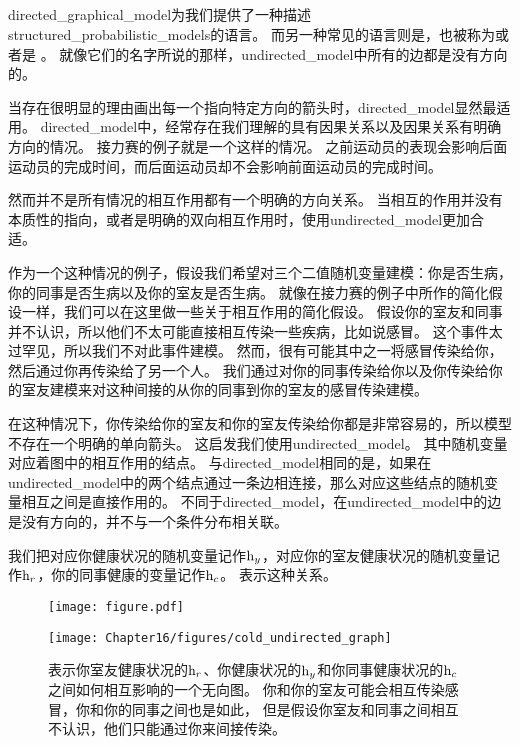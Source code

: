\subsection{}
\label{sec:undirected_models}


\gls{directed_graphical_model}为我们提供了一种描述\gls{structured_probabilistic_models}的语言。
而另一种常见的语言则是，也被称为或者是 \citep{kindermann-book-1980}。
就像它们的名字所说的那样，\gls{undirected_model}中所有的边都是没有方向的。


当存在很明显的理由画出每一个指向特定方向的箭头时，\gls{directed_model}显然最适用。
\gls{directed_model}中，经常存在我们理解的具有因果关系以及因果关系有明确方向的情况。
接力赛的例子就是一个这样的情况。
之前运动员的表现会影响后面运动员的完成时间，而后面运动员却不会影响前面运动员的完成时间。


然而并不是所有情况的相互作用都有一个明确的方向关系。
当相互的作用并没有本质性的指向，或者是明确的双向相互作用时，使用\gls{undirected_model}更加合适。


作为一个这种情况的例子，假设我们希望对三个二值随机变量建模：你是否生病，你的同事是否生病以及你的室友是否生病。
就像在接力赛的例子中所作的简化假设一样，我们可以在这里做一些关于相互作用的简化假设。
假设你的室友和同事并不认识，所以他们不太可能直接相互传染一些疾病，比如说感冒。
这个事件太过罕见，所以我们不对此事件建模。
然而，很有可能其中之一将感冒传染给你，然后通过你再传染给了另一个人。
我们通过对你的同事传染给你以及你传染给你的室友建模来对这种间接的从你的同事到你的室友的感冒传染建模。


在这种情况下，你传染给你的室友和你的室友传染给你都是非常容易的，所以模型不存在一个明确的单向箭头。
这启发我们使用\gls{undirected_model}。
其中随机变量对应着图中的相互作用的结点。
与\gls{directed_model}相同的是，如果在\gls{undirected_model}中的两个结点通过一条边相连接，那么对应这些结点的随机变量相互之间是直接作用的。
不同于\gls{directed_model}，在\gls{undirected_model}中的边是没有方向的，并不与一个条件分布相关联。


我们把对应你健康状况的随机变量记作$\mathrm{h}_y$，对应你的室友健康状况的随机变量记作$\mathrm{h}_r$，你的同事健康的变量记作$\mathrm{h}_c$。
表示这种关系。

\begin{figure}[!htb]
\ifOpenSource
\centerline{\texttt{[image: figure.pdf]}}
\else
	\centerline{\texttt{[image: Chapter16/figures/cold\_undirected\_graph]}}	
\fi
\caption{表示你室友健康状况的$\mathrm{h}_r$、你健康状况的$\mathrm{h}_y$和你同事健康状况的$\mathrm{h}_c$之间如何相互影响的一个无向图。
你和你的室友可能会相互传染感冒，你和你的同事之间也是如此，
但是假设你室友和同事之间相互不认识，他们只能通过你来间接传染。}
	\label{fig:cold_undirected_graph}
\end{figure}

